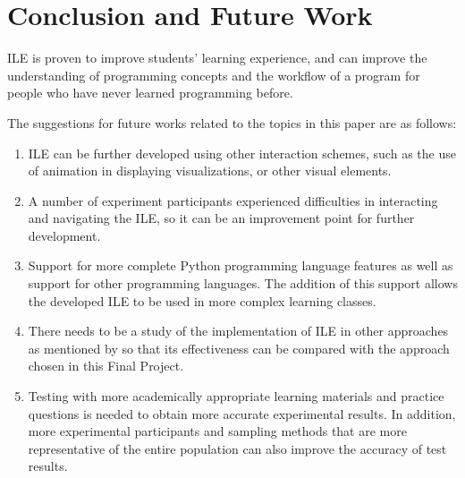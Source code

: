 \documentclass[conference]{IEEEtran}
\begin{document}
\section{Conclusion and Future Work}
ILE is proven to improve students' learning experience, and can improve the understanding of programming concepts and the workflow of a program for people who have never learned programming before.

The suggestions for future works related to the topics in this paper are as follows:
\begin{enumerate}
  \item ILE can be further developed using other interaction schemes, such as the use of animation in displaying visualizations, or other visual elements.
  \item A number of experiment participants experienced difficulties in interacting and navigating the ILE, so it can be an improvement point for further development.
  \item Support for more complete Python programming language features as well as support for other programming languages. The addition of this support allows the developed ILE to be used in more complex learning classes.
  \item There needs to be a study of the implementation of ILE in other approaches as mentioned by \cite{moons2013pilot} so that its effectiveness can be compared with the approach chosen in this Final Project.
  \item Testing with more academically appropriate learning materials and practice questions is needed to obtain more accurate experimental results. In addition, more experimental participants and sampling methods that are more representative of the entire population can also improve the accuracy of test results.
\end{enumerate}




\vspace{12pt}
\end{document}
